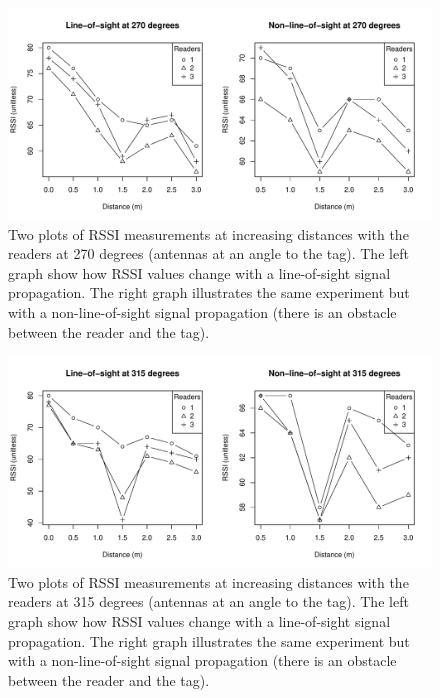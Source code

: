\begin{figure}
	\begin{center}
		\includegraphics[width=1\textwidth]{figures/rssi_distance_3m_270deg}
		\caption{Two plots of RSSI measurements at increasing distances with the readers at 270 degrees (antennas at an angle to the tag). The left graph show how RSSI values change with a line-of-sight signal propagation. The right graph illustrates the same experiment but with a non-line-of-sight signal propagation (there is an obstacle between the reader and the tag).}
	\end{center}
\end{figure}
\begin{figure}
	\begin{center}
		\includegraphics[width=1\textwidth]{figures/rssi_distance_3m_315deg}
		\caption{Two plots of RSSI measurements at increasing distances with the readers at 315 degrees (antennas at an angle to the tag). The left graph show how RSSI values change with a line-of-sight signal propagation. The right graph illustrates the same experiment but with a non-line-of-sight signal propagation (there is an obstacle between the reader and the tag).}
	\end{center}
\end{figure}
